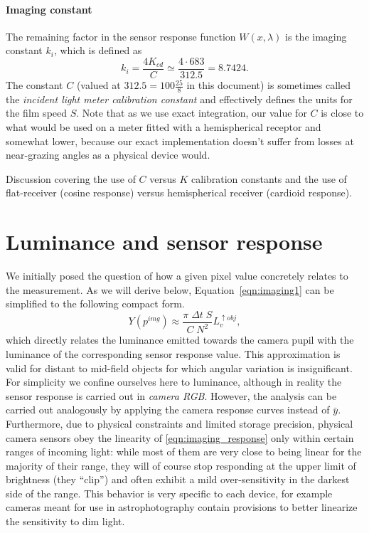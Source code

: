 \paragraph{Imaging constant}

The remaining factor in the sensor response function $W(x,\lambda)$ is the
imaging constant $k_i$, which is defined as
\begin{equation}\label{eqn:imaging_ki}
	k_i = \frac{4K_{cd}}{C} \simeq \frac{4\cdot683}{312.5} = 8.7424.
\end{equation}
The constant $C$ (valued at $312.5 = 100 \frac{25}8$ in this document) is sometimes called the \textsl{incident light meter
calibration constant} and effectively defines the units for the \gls{film speed} $S$.
Note that as we use exact integration, our value for $C$ is close to what would be used on a meter fitted with a hemispherical receptor and somewhat lower, because our exact implementation doesn't suffer from losses at near-grazing angles as a physical device would.

\begin{inconstruction}
	Discussion covering the use of $C$ versus $K$ calibration constants and
	the use of flat-receiver (cosine response) versus hemispherical receiver 
	(cardioid response).
\end{inconstruction}

\section{Luminance and sensor response}

We initially posed the question of how a given pixel value concretely
relates to the measurement. As we will derive below,
Equation~\eqref{eqn:imaging1} can be simplified to the following
compact form.
\begin{equation}\label{eqn:imaging_response}
	Y(p^{img}) \approx \frac{ \pi\;\Delta t\;S}{C\; N^2} L_v^{\uparrow obj},
\end{equation}
which directly relates the luminance emitted towards the camera pupil
with the luminance of the corresponding sensor response value. This approximation
is valid for distant to mid-field objects for which angular variation
is insignificant. For simplicity we confine ourselves here to luminance, although in
reality the sensor response is carried out in \textit{camera RGB}. However, the
analysis can be carried out analogously by applying the camera
response curves instead of $\bar y$. Furthermore, due to physical
constraints and limited storage precision, physical camera sensors
obey the linearity of \eqref{eqn:imaging_response} only within certain
ranges of incoming light: while most of them are very close to being linear for the
majority of their range, they will of course stop responding at the upper limit of 
brightness (they ``clip'') and often exhibit a mild over-sensitivity in the darkest 
side of the range. This behavior is very specific to each device, 
for example cameras meant for use in astrophotography contain provisions 
to better linearize the sensitivity to dim light.

